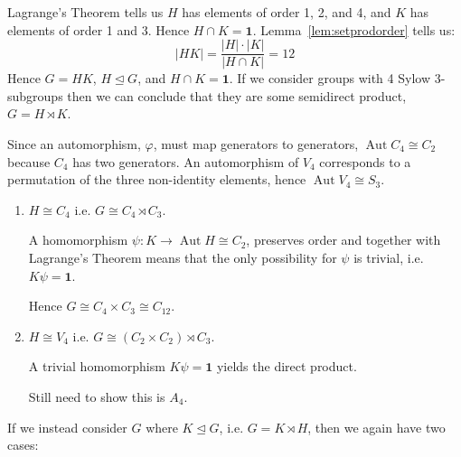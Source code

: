 \documentclass[a4paper, oneside, 12pt, final]{article}
\theoremstyle{definition}
\DeclareMathOperator{\Aut}{Aut}
\begin{document}
Lagrange's Theorem tells us \(H\) has elements of order 1, 2, and 4, and \(K\) has elements of order 1 and 3.
Hence \(H \cap K = \bm{1}\).
Lemma~\ref{lem:setprodorder} tells us:
\[|HK| = \frac{|H| \cdot |K|}{|H \cap K|} = 12\]
Hence \(G = HK\), \(H \unlhd G\), and \(H \cap K = \bm{1}\).
If we consider groups with 4 Sylow 3-subgroups then we can conclude that they are some semidirect product, \(G = H
\rtimes K\).

Since an automorphism, \(\varphi\), must map generators to generators, \(\Aut{C_4} \cong C_2\) because \(C_4\) has two
generators.
An automorphism of \(V_4\) corresponds to a permutation of the three
non-identity elements, hence \(\Aut{V_4} \cong S_3\).

\begin{enumerate}
    \item \(H \cong C_4\) i.e. \(G \cong C_4 \rtimes C_3\).

        A homomorphism \(\psi:K \to \Aut{H} \cong C_2\), preserves order and together with Lagrange's Theorem means that
        the only possibility for \(\psi\) is trivial, i.e. \(K\psi = \bm{1}\).

        Hence \(G \cong C_4 \times C_3 \cong C_{12}\).

    \item \(H \cong V_4\) i.e. \(G \cong (C_2 \times C_2) \rtimes C_3\).

        A trivial homomorphism \(K\psi = \bm{1}\) yields the direct product.

        Still need to show this is \(A_4\).
\end{enumerate}

If we instead consider \(G\) where \(K \unlhd G\), i.e. \(G = K \rtimes H\), then we again have two cases:
\end{document}

